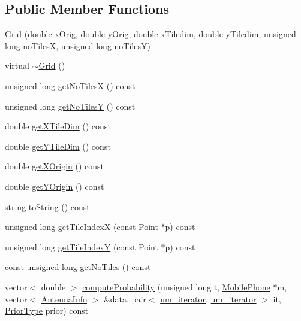\subsection*{Public Member Functions}
\begin{DoxyCompactItemize}
\item 
\mbox{\hyperlink{class_grid_a84b0dc169028f21175a4549afde86153}{Grid}} (double x\+Orig, double y\+Orig, double x\+Tiledim, double y\+Tiledim, unsigned long no\+TilesX, unsigned long no\+TilesY)
\item 
virtual \mbox{\hyperlink{class_grid_a241c623291936ddbf4f670a796523a91}{$\sim$\+Grid}} ()
\item 
unsigned long \mbox{\hyperlink{class_grid_af29c0c404a908aa46f83afb17d7609a6}{get\+No\+TilesX}} () const
\item 
unsigned long \mbox{\hyperlink{class_grid_a783a3153d03154cfd33e6a418bb8d390}{get\+No\+TilesY}} () const
\item 
double \mbox{\hyperlink{class_grid_a1c5b9ad91fac264bcdd67f99bc93f663}{get\+X\+Tile\+Dim}} () const
\item 
double \mbox{\hyperlink{class_grid_aedfe477f5be79a375bd64a4d21765918}{get\+Y\+Tile\+Dim}} () const
\item 
double \mbox{\hyperlink{class_grid_a08b534c7f8e1099a6903bf08d9727842}{get\+X\+Origin}} () const
\item 
double \mbox{\hyperlink{class_grid_a53141770920cf261579cf164a8909af9}{get\+Y\+Origin}} () const
\item 
string \mbox{\hyperlink{class_grid_ad48d195b5e333a94a3a14d6395252b2a}{to\+String}} () const
\item 
unsigned long \mbox{\hyperlink{class_grid_af4094832e2adedbbd47889973f5a40da}{get\+Tile\+IndexX}} (const Point $\ast$p) const
\item 
unsigned long \mbox{\hyperlink{class_grid_ae1eeb3b42007ae1cf19cfaf0d846fb9a}{get\+Tile\+IndexY}} (const Point $\ast$p) const
\item 
const unsigned long \mbox{\hyperlink{class_grid_ab0a71c762b6c33e6fa2fd49dde38228b}{get\+No\+Tiles}} () const
\item 
vector$<$ double $>$ \mbox{\hyperlink{class_grid_a15b32bc4e110b63b3506cd932afa5e2a}{compute\+Probability}} (unsigned long t, \mbox{\hyperlink{class_mobile_phone}{Mobile\+Phone}} $\ast$m, vector$<$ \mbox{\hyperlink{class_antenna_info}{Antenna\+Info}} $>$ \&data, pair$<$ \mbox{\hyperlink{_agents_collection_8h_afde47bc45d604b8b8c72755072376679}{um\+\_\+iterator}}, \mbox{\hyperlink{_agents_collection_8h_afde47bc45d604b8b8c72755072376679}{um\+\_\+iterator}} $>$ it, \mbox{\hyperlink{_prior_type_8h_a61286c562e68de246982fc393a7c23a5}{Prior\+Type}} prior) const

\end{DoxyCompactItemize}
